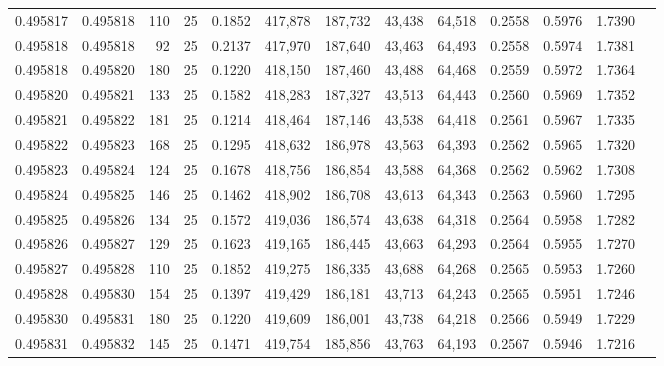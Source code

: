 \begin{tabular}{rrrrrrrrrrrrr}
0.495817 & 0.495818 &   110 &  25 &                                     0.1852 & 417,878 & 187,732 &  43,438 &  64,518 & 0.2558 & 0.5976 & 1.7390 \\
0.495818 & 0.495818 &    92 &  25 &                                     0.2137 & 417,970 & 187,640 &  43,463 &  64,493 & 0.2558 & 0.5974 & 1.7381 \\
0.495818 & 0.495820 &   180 &  25 &                                     0.1220 & 418,150 & 187,460 &  43,488 &  64,468 & 0.2559 & 0.5972 & 1.7364 \\
0.495820 & 0.495821 &   133 &  25 &                                     0.1582 & 418,283 & 187,327 &  43,513 &  64,443 & 0.2560 & 0.5969 & 1.7352 \\
0.495821 & 0.495822 &   181 &  25 &                                     0.1214 & 418,464 & 187,146 &  43,538 &  64,418 & 0.2561 & 0.5967 & 1.7335 \\
0.495822 & 0.495823 &   168 &  25 &                                     0.1295 & 418,632 & 186,978 &  43,563 &  64,393 & 0.2562 & 0.5965 & 1.7320 \\
0.495823 & 0.495824 &   124 &  25 &                                     0.1678 & 418,756 & 186,854 &  43,588 &  64,368 & 0.2562 & 0.5962 & 1.7308 \\
0.495824 & 0.495825 &   146 &  25 &                                     0.1462 & 418,902 & 186,708 &  43,613 &  64,343 & 0.2563 & 0.5960 & 1.7295 \\
0.495825 & 0.495826 &   134 &  25 &                                     0.1572 & 419,036 & 186,574 &  43,638 &  64,318 & 0.2564 & 0.5958 & 1.7282 \\
0.495826 & 0.495827 &   129 &  25 &                                     0.1623 & 419,165 & 186,445 &  43,663 &  64,293 & 0.2564 & 0.5955 & 1.7270 \\
0.495827 & 0.495828 &   110 &  25 &                                     0.1852 & 419,275 & 186,335 &  43,688 &  64,268 & 0.2565 & 0.5953 & 1.7260 \\
0.495828 & 0.495830 &   154 &  25 &                                     0.1397 & 419,429 & 186,181 &  43,713 &  64,243 & 0.2565 & 0.5951 & 1.7246 \\
0.495830 & 0.495831 &   180 &  25 &                                     0.1220 & 419,609 & 186,001 &  43,738 &  64,218 & 0.2566 & 0.5949 & 1.7229 \\
0.495831 & 0.495832 &   145 &  25 &                                     0.1471 & 419,754 & 185,856 &  43,763 &  64,193 & 0.2567 & 0.5946 & 1.7216 \\

\end{tabular}
